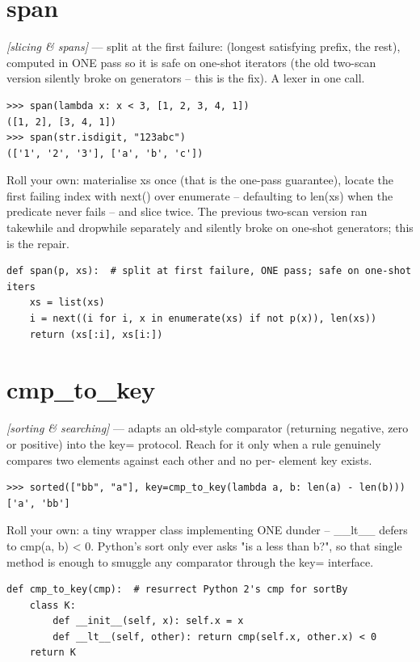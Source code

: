 \documentclass[11pt,letterpaper]{book}
\begin{document}
\section{span}
\noindent\textit{[slicing \& spans]} --- split at the first failure: (longest satisfying prefix, the rest), computed in ONE pass so it is safe on one-shot iterators (the old two-scan version silently broke on generators -- this is the fix). A lexer in one call.
\begin{lstlisting}[style=spec]
>>> span(lambda x: x < 3, [1, 2, 3, 4, 1])
([1, 2], [3, 4, 1])
>>> span(str.isdigit, "123abc")
(['1', '2', '3'], ['a', 'b', 'c'])
\end{lstlisting}

Roll your own: materialise xs once (that is the one-pass guarantee), locate the first failing index with next() over enumerate -- defaulting to len(xs) when the predicate never fails -- and slice twice. The previous two-scan version ran takewhile and dropwhile separately and silently broke on one-shot generators; this is the repair.

\begin{lstlisting}[style=code]
def span(p, xs):  # split at first failure, ONE pass; safe on one-shot iters
    xs = list(xs)
    i = next((i for i, x in enumerate(xs) if not p(x)), len(xs))
    return (xs[:i], xs[i:])
\end{lstlisting}

\section{cmp\_to\_key}
\noindent\textit{[sorting \& searching]} --- adapts an old-style comparator (returning negative, zero or positive) into the key= protocol. Reach for it only when a rule genuinely compares two elements against each other and no per- element key exists.
\begin{lstlisting}[style=spec]
>>> sorted(["bb", "a"], key=cmp_to_key(lambda a, b: len(a) - len(b)))
['a', 'bb']
\end{lstlisting}

Roll your own: a tiny wrapper class implementing ONE dunder -- \_\_lt\_\_ defers to cmp(a, b) < 0. Python's sort only ever asks "is a less than b?", so that single method is enough to smuggle any comparator through the key= interface.

\begin{lstlisting}[style=code]
def cmp_to_key(cmp):  # resurrect Python 2's cmp for sortBy
    class K:
        def __init__(self, x): self.x = x
        def __lt__(self, other): return cmp(self.x, other.x) < 0
    return K
\end{lstlisting}
\end{document}
